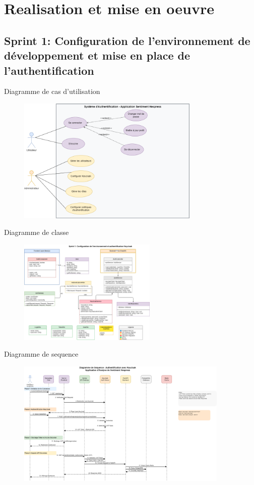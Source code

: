 \section{Realisation et mise en oeuvre}
\subsection{Sprint 1: Configuration de l'environnement de développement et mise en place de l'authentification}
\begin{frame}{Diagramme de cas d'utilisation}

    \begin{figure}[H]
        \centering
        \includegraphics[height=6cm]{assets/images/sprint1-usecase.png}
    \end{figure}
\end{frame}

\begin{frame}{Diagramme de classe}

    \begin{figure}[H]
        \centering
        \includegraphics[height=5cm]{assets/images/sprint1-class.png}
    \end{figure}
\end{frame}

\begin{frame}{Diagramme de sequence}
    \begin{figure}[H]
        \centering
        \includegraphics[height=6cm]{assets/images/sprint1-sequence.png}
    \end{figure}
\end{frame}

